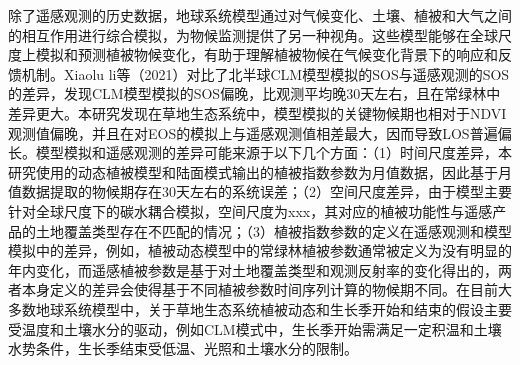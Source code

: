 除了遥感观测的历史数据，地球系统模型通过对气候变化、土壤、植被和大气之间的相互作用进行综合模拟，为物候监测提供了另一种视角。这些模型能够在全球尺度上模拟和预测植被物候变化，有助于理解植被物候在气候变化背景下的响应和反馈机制。Xiaolu li等（2021）对比了北半球CLM模型模拟的SOS与遥感观测的SOS的差异，发现CLM模型模拟的SOS偏晚，比观测平均晚30天左右，且在常绿林中差异更大。本研究发现在草地生态系统中，模型模拟的关键物候期也相对于NDVI观测值偏晚，并且在对EOS的模拟上与遥感观测值相差最大，因而导致LOS普遍偏长。模型模拟和遥感观测的差异可能来源于以下几个方面：（1）时间尺度差异，本研究使用的动态植被模型和陆面模式输出的植被指数参数为月值数据，因此基于月值数据提取的物候期存在30天左右的系统误差；（2）空间尺度差异，由于模型主要针对全球尺度下的碳水耦合模拟，空间尺度为xxx，其对应的植被功能性与遥感产品的土地覆盖类型存在不匹配的情况；（3）植被指数参数的定义在遥感观测和模型模拟中的差异，例如，植被动态模型中的常绿林植被参数通常被定义为没有明显的年内变化，而遥感植被参数是基于对土地覆盖类型和观测反射率的变化得出的，两者本身定义的差异会使得基于不同植被参数时间序列计算的物候期不同。在目前大多数地球系统模型中，关于草地生态系统植被动态和生长季开始和结束的假设主要受温度和土壤水分的驱动，例如CLM模式中，生长季开始需满足一定积温和土壤水势条件，生长季结束受低温、光照和土壤水分的限制。